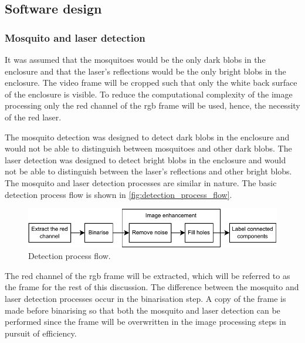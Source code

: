 \FloatBarrier
\subsection{Software design}\label{subsec:software_design}
\subsubsection{Mosquito and laser detection} \label{subsubsec:mosquito_and_laser_detection}
It was assumed that the mosquitoes would be the only dark blobs in the enclosure and that the laser's reflections would be the only bright blobs in the enclosure. The video frame will be cropped such that only the white back surface of the enclosure is visible. To reduce the computational complexity of the image processing only the red channel of the \gls{rgb} frame will be used, hence, the necessity of the red laser.

The mosquito detection was designed to detect dark blobs in the enclosure and would not be able to distinguish between mosquitoes and other dark blobs. The laser detection was designed to detect bright blobs in the enclosure and would not be able to distinguish between the laser's reflections and other bright blobs. The mosquito and laser detection processes are similar in nature. The basic detection process flow is shown in \autoref{fig:detection_process_flow}.
\begin{figure}[!htb]
  \centering
  \includegraphics[width=\textwidth]{figures/detection/detection_process_flow.pdf}
  \caption{Detection process flow.}
  \label{fig:detection_process_flow}
\end{figure}
The red channel of the \gls{rgb} frame will be extracted, which will be referred to as the frame for the rest of this discussion. The difference between the mosquito and laser detection processes occur in the binarisation step. A copy of the frame is made before binarising so that both the mosquito and laser detection can be performed since the frame will be overwritten in the image processing steps in pursuit of efficiency.


